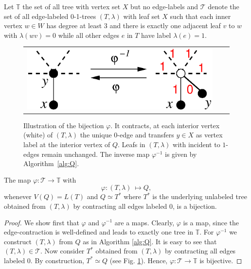 \documentclass[smallextended]{svjour3}
\newcommand{\rev}[1]{\begingroup\color{blue}#1\endgroup}
\begin{document}
Let $\mathbb{T}$ the set of all tree with vertex set $X$ but no edge-labels
and $\mathcal{T}$ denote the set of all edge-labeled 0-1-trees $(T,\lambda)$ with
leaf set $X$ such that each inner vertex $w\in W$ has degree at least $3$ and 
there is exactly one adjacent leaf $v$ to $w$ with $\lambda(wv)=0$ 
while all other edges $e$ in $T$ have label $\lambda(e)=1$. 

\begin{figure}
\begin{tabular}{lcr}
\begin{minipage}{0.5\textwidth}
\begin{center}
\includegraphics[width=\textwidth]{bijection.eps}
\end{center} 
\end{minipage} & & 
\begin{minipage}{0.4\textwidth}
  \caption{\rev{Illustration of the bijection $\varphi$. It contracts, at
      each interior vertex (white) of $(T,\lambda)$ the unique $0$-edge and
      transfers $y\in X$ as vertex label at the interior vertex of $Q$.
      Leafs in $(T,\lambda)$ with incident to $1$-edges remain unchanged.
      The inverse map $\varphi^{-1}$ is given by Algorithm~\ref{alg:Q}.}}
  \label{fig:bijection}
\end{minipage}
\end{tabular}
\end{figure}

\rev{
\begin{lemma}
	The map  $\varphi : \mathcal{T} \to  \mathbb{T}$ with \[\varphi: (T,\lambda)\ \mapsto Q, \] whenever
	$V(Q)=L(T)$ and  
	$Q\simeq T^*$ where $T^*$ is the underlying unlabeled tree obtained from $(T,\lambda)$ by 
	contracting all edges labeled $0$, is a bijection.
	\label{lem:bijection}
\end{lemma}
\begin{proof}
	We show first that $\varphi$ and $\varphi^{-1}$ are a maps.  
	Clearly, $\varphi$ is a map, since the edge-contraction 
	is well-defined and leads to exactly one tree in $\mathbb{T}$. 
	For $\varphi^{-1}$ we construct $(T,\lambda)$ from $Q$
	as in Algorithm \ref{alg:Q}. 
	It is easy to see that  $(T,\lambda) \in  \mathcal{T}$. 
	Now consider $T^*$ obtained from  $(T,\lambda)$ by 
	contracting all edges labeled $0$. By construction, 
	$T^* \simeq Q$ (see Fig. \ref{fig:bijection}). 
	Hence,  $\varphi : \mathcal{T} \to  \mathbb{T}$ is bijective.
\end{proof}
}
\end{document}
